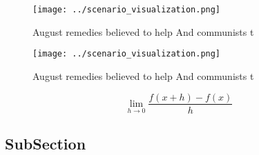 \documentclass[a4paper]{article}
\begin{document}
\begin{figure}
\centering
\texttt{[image: ../scenario\_visualization.png]}
\caption{August remedies believed to help And communists t
}
\end{figure}
 
\begin{figure}
\centering
\texttt{[image: ../scenario\_visualization.png]}
\caption{August remedies believed to help And communists t
}
\end{figure}
 
\[\lim_{h \rightarrow 0 } \frac{f(x+h)-f(x)}{h}\]

\subsection{SubSection}
\end{document}
